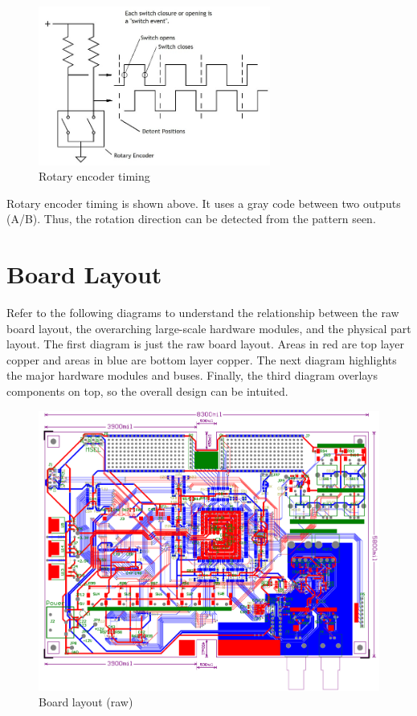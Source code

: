\begin{figure}[ht!]
    \centering
    \includegraphics[width=3in]{Timing/encoder.jpg}
		\caption{Rotary encoder timing}
\end{figure}

Rotary encoder timing is shown above. It uses a gray code between two outputs (A/B). Thus, the rotation direction can be detected from the pattern seen.

\section{Board Layout}

Refer to the following diagrams to understand the relationship between the raw board layout, the overarching large-scale hardware modules, and the physical part layout. The first diagram is just the raw board layout. Areas in red are top layer copper and areas in blue are bottom layer copper. The next diagram highlights the major hardware modules and buses. Finally, the third diagram overlays components on top, so the overall design can be intuited.

\begin{figure}[ht!]
    \centering
    \includegraphics[width=6in]{circuit/board.png}
		\caption{Board layout (raw)}
\end{figure}

